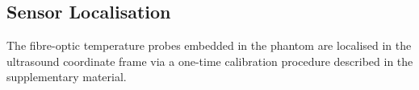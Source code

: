 \subsection{Sensor Localisation}
\label{sec:sensor_localization}
The fibre-optic temperature probes embedded in the phantom are localised in
the ultrasound coordinate frame via a one-time calibration procedure
described in the supplementary material.
